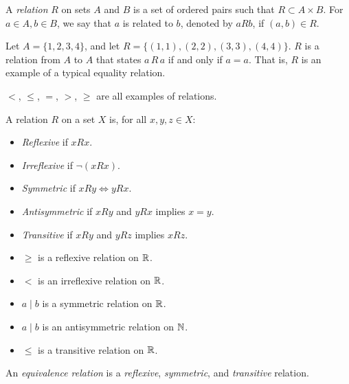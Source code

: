 \begin{defn}
    A \emph{relation} $R$ on sets $A$ and $B$ is a set of ordered pairs such that $R \subset A \times B$. For $a \in A, b \in B$, we say that $a$ is related to $b$, denoted by $a R b$, if $(a, b) \in R$.
\end{defn}

\begin{exmp}
    Let $A = \{1, 2, 3, 4\}$, and let $R = \{(1, 1), (2, 2), (3, 3), (4, 4)\}$. $R$ is a relation from $A$ to $A$ that states $a \,R\, a$ if and only if $a = a$. That is, $R$ is an example of a typical equality relation.
\end{exmp}

\begin{exmp}
    $<$, $\leq$, $=$, $>$, $\geq$ are all examples of relations.
\end{exmp}

\begin{defn}
    A relation $R$ on a set $X$ is, for all $x, y, z \in X$:
    \begin{itemize}
        \item \emph{Reflexive} if $x R x$.
        \item \emph{Irreflexive} if $\neg(x R x)$.
        \item \emph{Symmetric} if $x R y \iff y R x$.
        \item \emph{Antisymmetric} if $x R y$ and $y R x$ implies $x = y$.
        \item \emph{Transitive} if $x R y$ and $y R z$ implies $x R z$.
    \end{itemize}
\end{defn}

\begin{exmp}\proofbreak
    \begin{itemize}
        \item $\geq$ is a reflexive relation on $\mathbb{R}$.
        \item $<$ is an irreflexive relation on $\mathbb{R}$.
        \item $a \mid b$ is a symmetric relation on $\mathbb{R}$.
        \item $a \mid b$ is an antisymmetric relation on $\mathbb{N}$.
        \item $\leq$ is a transitive relation on $\mathbb{R}$.
    \end{itemize}
\end{exmp}

\begin{defn}\label{equivalence-relation}
    An \emph{equivalence relation} is a \emph{reflexive}, \emph{symmetric}, and \emph{transitive} relation.
\end{defn}

